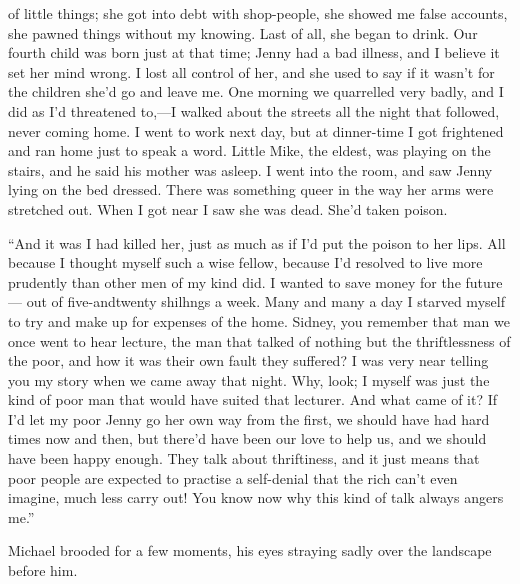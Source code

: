 of little things; she got into debt with shop-people, she showed {}me
false accounts, she pawned things without my knowing. Last of all, she
began to drink. Our fourth child was born just at that time; Jenny had a
bad illness, and I believe it set her mind wrong. I lost all control of
her, and she used to say if it wasn't for the children she'd go and
leave me. One morning we quarrelled very badly, and I did as I'd
threatened to,---I walked about the streets all the night that followed,
never coming home. I went to work next day, but at dinner-time I got
frightened and ran home just to speak a word. Little Mike, the eldest,
was playing on the stairs, and he said his mother was asleep. I went
into the room, and saw Jenny lying on the bed dressed. There was
something queer in the way her arms were stretched out. When I got near
I saw she was dead. She'd taken poison.

``And it was I had killed her, just as much as if I'd put the poison to
her lips. All because I thought myself such a wise fellow, because I'd
resolved to live more prudently {}than other men of my kind did. I
wanted to save money for the future--- out of five-andtwenty shilhngs a
week. Many and many a day I starved myself to try and make up for
expenses of the home. Sidney, you remember that man we once went to hear
lecture, the man that talked of nothing but the thriftlessness of the
poor, and how it was their own fault they suffered? I was very near
telling you my story when we came away that night. Why, look; I myself
was just the kind of poor man that would have suited that lecturer. And
what came of it? If I'd let my poor Jenny go her own way from the first,
we should have had hard times now and then, but there'd have been our
love to help us, and we should have been happy enough. They talk about
thriftiness, and it just means that poor people are expected to practise
a self-denial that the rich can't even imagine, much less carry out! You
know now why this kind of talk always angers me.''

Michael brooded for a few moments, his eyes straying sadly over the
landscape before him.

